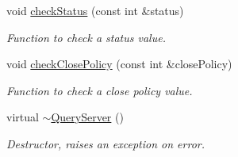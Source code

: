 \begin{DoxyCompactItemize}
void \hyperlink{classQueryServer_a358f371f74bcb2dd3e789bd20d0cb672}{checkStatus} (const int \&status)
\begin{DoxyCompactList}\small\item\em Function to check a status value. \item\end{DoxyCompactList}\item 
void \hyperlink{classQueryServer_a73cc37f1e18f4e5028d8f4d68b9b148f}{checkClosePolicy} (const int \&closePolicy)
\begin{DoxyCompactList}\small\item\em Function to check a close policy value. \item\end{DoxyCompactList}\item 
\hypertarget{classQueryServer_ac1522f625d161ff74da960d37c1b58d1}{
virtual \hyperlink{classQueryServer_ac1522f625d161ff74da960d37c1b58d1}{$\sim$QueryServer} ()}
\label{classQueryServer_ac1522f625d161ff74da960d37c1b58d1}

\begin{DoxyCompactList}\small\item\em Destructor, raises an exception on error. \item\end{DoxyCompactList}\end{DoxyCompactItemize}
